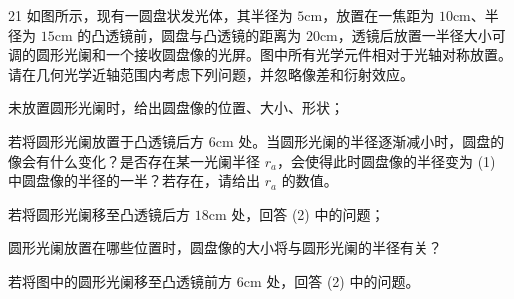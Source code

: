 \begin{problem}[第31届全国中学生物理竞赛复赛][圆盘成像与光阑]{21}
如图所示，现有一圆盘状发光体，其半径为 $5\mathrm{cm}$，放置在一焦距为 $10\mathrm{cm}$、半径为 $15\mathrm{cm}$ 的凸透镜前，圆盘与凸透镜的距离为 $20\mathrm{cm}$，透镜后放置一半径大小可调的圆形光阑和一个接收圆盘像的光屏。图中所有光学元件相对于光轴对称放置。请在几何光学近轴范围内考虑下列问题，并忽略像差和衍射效应。
    \begin{subproblem}
        未放置圆形光阑时，给出圆盘像的位置、大小、形状；
    \end{subproblem}
    \begin{subproblem}
        若将圆形光阑放置于凸透镜后方 $6\mathrm{cm}$ 处。当圆形光阑的半径逐渐减小时，圆盘的像会有什么变化？是否存在某一光阑半径 $r_a$，会使得此时圆盘像的半径变为 (1) 中圆盘像的半径的一半？若存在，请给出 $r_a$ 的数值。
    \end{subproblem}
    \begin{subproblem}
        若将圆形光阑移至凸透镜后方 $18\mathrm{cm}$ 处，回答 (2) 中的问题；
    \end{subproblem}
    \begin{subproblem}
        圆形光阑放置在哪些位置时，圆盘像的大小将与圆形光阑的半径有关？
    \end{subproblem}
    \begin{subproblem}
        若将图中的圆形光阑移至凸透镜前方 $6\mathrm{cm}$ 处，回答 (2) 中的问题。
    \end{subproblem}
\end{problem}